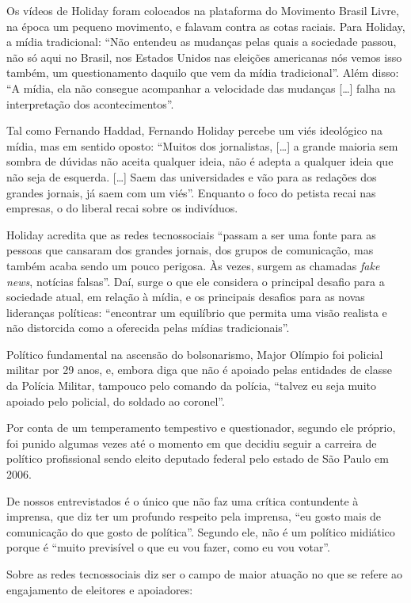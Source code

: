 Os vídeos de Holiday foram colocados na plataforma do Movimento Brasil
Livre, na época um pequeno movimento, e falavam contra as cotas raciais.
Para Holiday, a mídia tradicional: ``Não entendeu as mudanças pelas
quais a sociedade passou, não só aqui no Brasil, nos Estados Unidos nas
eleições americanas nós vemos isso também, um questionamento daquilo que
vem da mídia tradicional''. Além disso: ``A mídia, ela não consegue
acompanhar a velocidade das mudanças {[}\ldots{}{]} falha na interpretação
dos acontecimentos''.

Tal como Fernando Haddad, Fernando Holiday percebe um viés ideológico na
mídia, mas em sentido oposto: ``Muitos dos jornalistas, {[}\ldots{}{]} a
grande maioria sem sombra de dúvidas não aceita qualquer ideia, não é
adepta a qualquer ideia que não seja de esquerda. {[}\ldots{}{]} Saem das
universidades e vão para as redações dos grandes jornais, já saem com um
viés''. Enquanto o foco do petista recai nas empresas, o do liberal
recai sobre os indivíduos.

Holiday acredita que as redes tecnossociais ``passam a ser uma fonte
para as pessoas que cansaram dos grandes jornais, dos grupos de
comunicação, mas também acaba sendo um pouco perigosa. Às vezes, surgem
as chamadas \textit{fake news}, notícias falsas''. Daí, surge o que ele
considera o principal desafio para a sociedade atual, em relação à
mídia, e os principais desafios para as novas lideranças políticas:
``encontrar um equilíbrio que permita uma visão realista e não
distorcida como a oferecida pelas mídias tradicionais''.

Político fundamental na ascensão do bolsonarismo, Major Olímpio foi
policial militar por 29 anos, e, embora diga que não é apoiado pelas
entidades de classe da Polícia Militar, tampouco pelo comando da
polícia, ``talvez eu seja muito apoiado pelo policial, do soldado ao
coronel''.

Por conta de um temperamento tempestivo e questionador, segundo ele
próprio, foi punido algumas vezes até o momento em que decidiu seguir a
carreira de político profissional sendo eleito deputado federal pelo
estado de São Paulo em 2006.

De nossos entrevistados é o único que não faz uma crítica contundente à
imprensa, que diz ter um profundo respeito pela imprensa, ``eu gosto
mais de comunicação do que gosto de política''. Segundo ele, não é um
político midiático porque é ``muito previsível o que eu vou fazer, como
eu vou votar''.

Sobre as redes tecnossociais diz ser o campo de maior atuação no que se
refere ao engajamento de eleitores e apoiadores:

